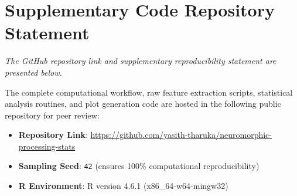 \newpage

\chapter{Supplementary Code Repository Statement}
\label{app:repository}

\textit{The GitHub repository link and supplementary reproducibility statement are presented below.}

The complete computational workflow, raw feature extraction scripts, statistical analysis routines, and plot generation code are hosted in the following public repository for peer review:

\begin{itemize}
    \item \textbf{Repository Link}: \url{https://github.com/yasith-tharuka/neuromorphic-processing-stats}
    \item \textbf{Sampling Seed}: \texttt{42} (ensures 100\% computational reproducibility)
    \item \textbf{R Environment}: R version 4.6.1 (x86\_64-w64-mingw32)
\end{itemize}
